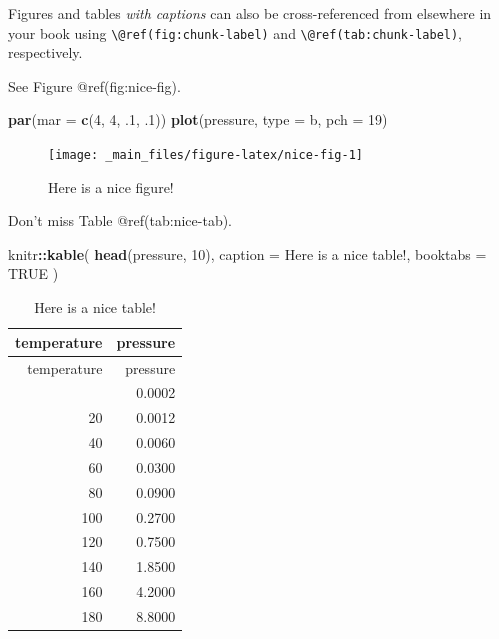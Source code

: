 \documentclass[
]{book}
\newenvironment{Shaded}{\begin{snugshade}}{\end{snugshade}}
\newcommand{\AttributeTok}[1]{\textcolor[rgb]{0.13,0.29,0.53}{#1}}
\newcommand{\ConstantTok}[1]{\textcolor[rgb]{0.56,0.35,0.01}{#1}}
\newcommand{\DecValTok}[1]{\textcolor[rgb]{0.00,0.00,0.81}{#1}}
\newcommand{\FunctionTok}[1]{\textcolor[rgb]{0.13,0.29,0.53}{\textbf{#1}}}
\newcommand{\NormalTok}[1]{#1}
\newcommand{\SpecialCharTok}[1]{\textcolor[rgb]{0.81,0.36,0.00}{\textbf{#1}}}
\newcommand{\StringTok}[1]{\textcolor[rgb]{0.31,0.60,0.02}{#1}}
\begin{document}
Figures and tables \emph{with captions} can also be cross-referenced
from elsewhere in your book using
\texttt{\textbackslash{}@ref(fig:chunk-label)} and
\texttt{\textbackslash{}@ref(tab:chunk-label)}, respectively.

See Figure @ref(fig:nice-fig).

\begin{Shaded}
\begin{Highlighting}[]
\FunctionTok{par}\NormalTok{(}\AttributeTok{mar =} \FunctionTok{c}\NormalTok{(}\DecValTok{4}\NormalTok{, }\DecValTok{4}\NormalTok{, .}\DecValTok{1}\NormalTok{, .}\DecValTok{1}\NormalTok{))}
\FunctionTok{plot}\NormalTok{(pressure, }\AttributeTok{type =} \StringTok{\textquotesingle{}b\textquotesingle{}}\NormalTok{, }\AttributeTok{pch =} \DecValTok{19}\NormalTok{)}
\end{Highlighting}
\end{Shaded}

\begin{figure}

{\centering \texttt{[image: \_main\_files/figure-latex/nice-fig-1]} 

}

\caption{Here is a nice figure!}\label{fig:nice-fig}
\end{figure}

Don't miss Table @ref(tab:nice-tab).

\begin{Shaded}
\begin{Highlighting}[]
\NormalTok{knitr}\SpecialCharTok{::}\FunctionTok{kable}\NormalTok{(}
  \FunctionTok{head}\NormalTok{(pressure, }\DecValTok{10}\NormalTok{), }\AttributeTok{caption =} \StringTok{\textquotesingle{}Here is a nice table!\textquotesingle{}}\NormalTok{,}
  \AttributeTok{booktabs =} \ConstantTok{TRUE}
\NormalTok{)}
\end{Highlighting}
\end{Shaded}

\begin{longtable}[]{@{}rr@{}}
\caption{Here is a nice table!}\tabularnewline
\toprule\noalign{}
temperature & pressure \\
\midrule\noalign{}
\endfirsthead
\toprule\noalign{}
temperature & pressure \\
\midrule\noalign{}
\endhead
\bottomrule\noalign{}
\endlastfoot
0 & 0.0002 \\
20 & 0.0012 \\
40 & 0.0060 \\
60 & 0.0300 \\
80 & 0.0900 \\
100 & 0.2700 \\
120 & 0.7500 \\
140 & 1.8500 \\
160 & 4.2000 \\
180 & 8.8000 \\
\end{longtable}
\end{document}

